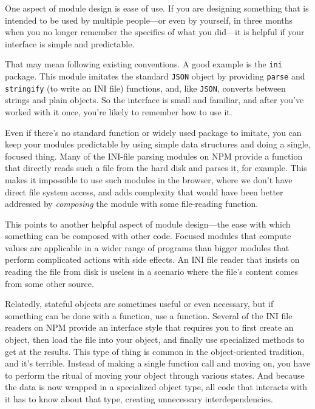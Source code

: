 One aspect of module design is ease of use. If you are designing something that is intended to be used by multiple people—or even by yourself, in three months when you no longer remember the specifics of what you did—it is helpful if your interface is simple and predictable.

That may mean following existing conventions. A good example is the \lstinline`ini` package. This module imitates the standard \lstinline`JSON` object by providing \lstinline`parse` and \lstinline`stringify` (to write an INI file) functions, and, like \lstinline`JSON`, converts between strings and plain objects. So the interface is small and familiar, and after you've worked with it once, you're likely to remember how to use it.

Even if there's no standard function or widely used package to imitate, you can keep your modules predictable by using simple data
structures and doing a single, focused thing. Many of the INI-file parsing modules on NPM provide a function that directly reads such a file from the hard disk and parses it, for example. This makes it impossible to use such modules in the browser, where we don't have direct file system access, and adds complexity that would have been better addressed by \emph{composing} the module with some file-reading function.

This points to another helpful aspect of module design—the ease with which something can be composed with other code. Focused modules that compute values are applicable in a wider range of programs than bigger modules that perform complicated actions with side effects. An INI file reader that insists on reading the file from disk is useless in a scenario where the file's content comes from some other source.

Relatedly, stateful objects are sometimes useful or even necessary, but if something can be done with a function, use a function. Several of the INI file readers on NPM provide an interface style that requires you to first create an object, then load the file into your object, and finally use specialized methods to get at the results. This type of thing is common in the object-oriented tradition, and it's terrible. Instead of making a single function call and moving on, you have to perform the ritual of moving your object through various states. And because the data is now wrapped in a specialized object type, all code that interacts with it has to know about that type, creating unnecessary interdependencies.

